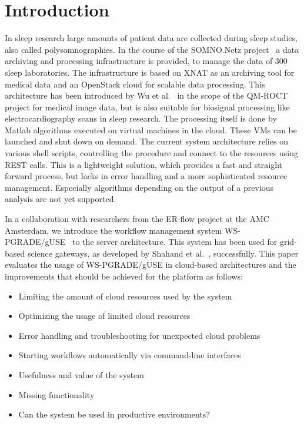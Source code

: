 \section{Introduction}\label{introduction}

In sleep research large amounts of patient data are collected during sleep studies, also called polysomnographies.
In the course of the SOMNO.Netz project~\cite{krefting13} a data archiving and processing infrastructure is provided, to manage the data of 300 sleep laboratories.
The infrastructure is based on XNAT as an archiving tool for medical data and an OpenStack cloud for scalable data processing.
This architecture has been introduced by Wu et al.~\cite{wu14} in the scope of the QM-ROCT project for medical image data, but is also suitable for biosignal processing like electrocardiography scans in sleep research.
The processing itself is done by Matlab algorithms executed on virtual machines in the cloud. These VMs can be launched and shut down on demand.
The current system architecture relies on various shell scripts, controlling the procedure and connect to the resources using REST \cite{richardson07} calls.
This is a lightweight solution, which provides a fast and straight forward process, but lacks in error handling and a more sophisticated resource management.
Especially algorithms depending on the output of a previous analysis are not yet supported.

In a collaboration with researchers from the ER-flow project at the AMC Amsterdam, we introduce the workflow management system WS-PGRADE/gUSE~\cite{balasko13} to the server architecture. This system has been used for grid-based science gateways, as developed by Shahand et al.~\cite{shahand13}, successfully.
This paper evaluates the usage of WS-PGRADE/gUSE in cloud-based architectures and the improvements that should be achieved for the platform as follows:

\begin{itemize}
\item Limiting the amount of cloud resources used by the system
\item Optimizing the usage of limited cloud resources
\item Error handling and troubleshooting for unexpected cloud problems
\item Starting workflows automatically via command-line interfaces
\item Usefulness and value of the system
\item Missing functionality
\item Can the system be used in productive environments?
\end{itemize}